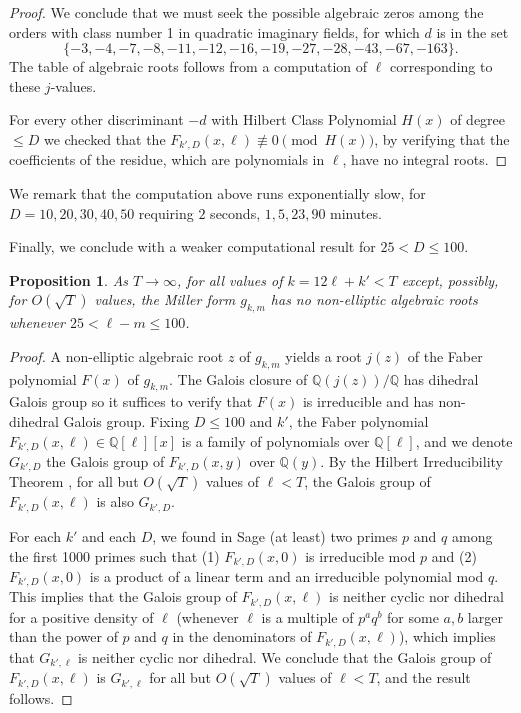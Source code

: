 \documentclass[12pt]{amsart}
\theoremstyle{plain} %
\newtheorem{proposition}[theorem]{Proposition}
\theoremstyle{definition}
\theoremstyle{remark}
\numberwithin{equation}{section}
\begin{document}
\begin{proof}
\begin{table}[h]
\end{table}


We conclude that we must seek the possible algebraic zeros among the orders with class number 1 in quadratic
imaginary fields, for which $d$ is in the set
\[ \{-3, -4, -7, -8, -11, -12, -16, -19, -27, -28, -43, -67, -163\}.\]
The table of algebraic roots follows from a computation of $\ell$ corresponding to these $j$-values. 

For every other discriminant $-d$ with Hilbert Class Polynomial $H(x)$ of degree $\leq D$ we checked that the $F_{k',D}(x,\ell)\not\equiv 0\pmod{H(x)}$, by verifying that the coefficients of the residue, which are polynomials in $\ell$, have no integral roots.
\end{proof}
We remark that the computation above runs exponentially slow, for $D=10,20,30,40,50$ requiring $2$ seconds, $1, 5, 23, 90$ minutes.

Finally, we conclude with a weaker computational result for
$25< D\leq 100$.
\begin{proposition}
As $T\to \infty$, for all values of $k=12\ell+k'<T$ except, possibly, for $O(\sqrt{T})$ values, the Miller form $g_{k,m}$ has no non-elliptic algebraic roots whenever $25<\ell-m\leq 100$. 
\end{proposition}
\begin{proof}
A non-elliptic algebraic root $z$ of $g_{k,m}$ yields a root
$j(z)$ of the Faber polynomial $F(x)$ of $g_{k,m}$. The Galois
closure of $\mathbb{Q}(j(z))/\mathbb{Q}$ has dihedral Galois
group so it suffices to verify that $F(x)$ is irreducible and
has non-dihedral Galois group. Fixing $D\leq 100$ and $k'$, the
Faber polynomial $F_{k',D}(x,\ell)\in \mathbb{Q}[\ell][x]$ is a family of
polynomials over $\mathbb{Q}[\ell]$, and we denote $G_{k',D}$ the Galois group  of $F_{k',D}(x,y)$ over $\mathbb{Q}(y)$. By the Hilbert Irreducibility Theorem \cite[\S9]{serre:mordell}, for all but $O(\sqrt{T})$ values of $\ell<T$, the Galois group of $F_{k',D}(x,\ell)$ is also $G_{k',D}$. 

For each $k'$ and each $D$, we found in Sage (at least) two primes $p$ and $q$ among the first 1000 primes such
that (1) $F_{k',D}(x,0)$ is irreducible mod $p$ and
(2)  $F_{k',D}(x,0)$ is a product of a linear term and an irreducible polynomial mod $q$. This implies that the Galois group of $F_{k',D}(x,\ell)$ is neither cyclic nor dihedral for a positive density of $\ell$ (whenever $\ell$ is a multiple of $p^aq^b$ for some $a,b$ larger than the power of $p$ and $q$ in the denominators of $F_{k',D}(x,\ell)$), which implies that $G_{k',\ell}$ is neither cyclic nor dihedral. We conclude that the Galois group of $F_{k',D}(x,\ell)$ is $G_{k',\ell}$ for all but $O(\sqrt{T})$ values of $\ell<T$, and the result follows.

\end{proof}
\end{document}
